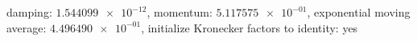 damping: $\num[scientific-notation=true]{1.544099e-12}$, momentum: $\num[scientific-notation=true]{5.117575e-01}$, exponential moving average: $\num[scientific-notation=true]{4.496490e-01}$, initialize Kronecker factors to identity: yes